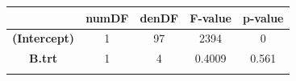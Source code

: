 \documentclass[]{article}
\begin{document}
\begin{longtable}[]{@{}ccccc@{}}
\toprule
\begin{minipage}[b]{0.29\columnwidth}\centering\strut
~\strut
\end{minipage} & \begin{minipage}[b]{0.10\columnwidth}\centering\strut
numDF\strut
\end{minipage} & \begin{minipage}[b]{0.10\columnwidth}\centering\strut
denDF\strut
\end{minipage} & \begin{minipage}[b]{0.12\columnwidth}\centering\strut
F-value\strut
\end{minipage} & \begin{minipage}[b]{0.12\columnwidth}\centering\strut
p-value\strut
\end{minipage}\tabularnewline
\midrule
\endhead
\begin{minipage}[t]{0.29\columnwidth}\centering\strut
\textbf{(Intercept)}\strut
\end{minipage} & \begin{minipage}[t]{0.10\columnwidth}\centering\strut
1\strut
\end{minipage} & \begin{minipage}[t]{0.10\columnwidth}\centering\strut
97\strut
\end{minipage} & \begin{minipage}[t]{0.12\columnwidth}\centering\strut
2394\strut
\end{minipage} & \begin{minipage}[t]{0.12\columnwidth}\centering\strut
0\strut
\end{minipage}\tabularnewline
\begin{minipage}[t]{0.29\columnwidth}\centering\strut
\textbf{B.trt}\strut
\end{minipage} & \begin{minipage}[t]{0.10\columnwidth}\centering\strut
1\strut
\end{minipage} & \begin{minipage}[t]{0.10\columnwidth}\centering\strut
4\strut
\end{minipage} & \begin{minipage}[t]{0.12\columnwidth}\centering\strut
0.4009\strut
\end{minipage} & \begin{minipage}[t]{0.12\columnwidth}\centering\strut
0.561\strut
\end{minipage}\tabularnewline
\begin{minipage}[t]{0.29\columnwidth}\centering\strut

\end{minipage}
\end{longtable}
\end{document}
